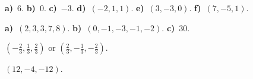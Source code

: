 \begin{Answer}{3.1}
\textbf{a)}~$6$.
					\textbf{b)}~$0$.
					\textbf{c)}~$-3$.
					\textbf{d)}~$(-2, 1, 1)$.
					\textbf{e)}~$(3, -3, 0)$.
					\textbf{f)}~$(7, -5, 1)$.
\end{Answer}
\begin{Answer}{3.2}
\textbf{a)}~$(2,3,3,7,8)$.
					\textbf{b)}~$(0,-1,-3,-1,-2)$.
					\textbf{c)}~$30$.
\end{Answer}
\begin{Answer}{3.3}
$(-\frac{2}{3}, \frac{1}{3}, \frac{2}{3})$ or $(\frac{2}{3}, -\frac{1}{3}, -\frac{2}{3})$.
\end{Answer}
\begin{Answer}{3.4}
$(12, -4, -12)$.
\end{Answer}
